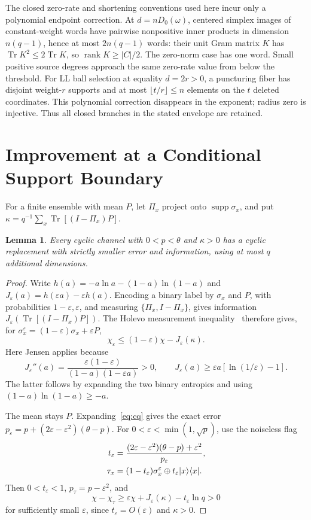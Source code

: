 \documentclass[12pt,letterpaper,onecolumn]{article}
\newtheorem{lemma}[theorem]{Lemma}
\theoremstyle{definition}
\theoremstyle{remark}
\DeclareMathOperator{\Tr}{Tr}
\DeclareMathOperator{\supp}{supp}
\DeclareMathOperator{\rank}{rank}
\begin{document}
The closed zero-rate and shortening conventions used here incur only a polynomial endpoint correction. At \(d=nD_0(\omega)\), centered simplex images of constant-weight words have pairwise nonpositive inner products in dimension \(n(q-1)\), hence at most \(2n(q-1)\) words: their unit Gram matrix \(K\) has \(\Tr K^2\le2\Tr K\), so \(\rank K\ge |C|/2\). The zero-norm case has one word. Small positive source degrees approach the same zero-rate value from below the threshold. For LL ball selection at equality \(d=2r>0\), a puncturing fiber has disjoint weight-\(r\) supports and at most \(\lfloor t/r\rfloor\le n\) elements on the \(t\) deleted coordinates. This polynomial correction disappears in the exponent; radius zero is injective. Thus all closed branches in the stated envelope are retained.

\section{Improvement at a Conditional Support Boundary}
For a finite ensemble with mean \(P\), let \(\Pi_x\) project onto \(\supp\sigma_x\), and put
\(\kappa=q^{-1}\sum_x\Tr[(I-\Pi_x)P]\).

\begin{lemma}\label{lem:activation}
Every cyclic channel with \(0<p<\theta\) and \(\kappa>0\) has a cyclic replacement with strictly smaller error and information, using at most \(q\) additional dimensions.
\end{lemma}
\begin{proof}
Write \(h(a)=-a\ln a-(1-a)\ln(1-a)\) and
\(J_\varepsilon(a)=h(\varepsilon a)-\varepsilon h(a)\).
Encoding a binary label by \(\sigma_x\) and \(P\), with probabilities \(1-\varepsilon,\varepsilon\), and measuring
\(\{\Pi_x,I-\Pi_x\}\), gives information \(J_\varepsilon(\Tr[(I-\Pi_x)P])\). The Holevo measurement inequality~\cite{Holevo1973} therefore gives, for
\(\sigma_x^\varepsilon=(1-\varepsilon)\sigma_x+\varepsilon P\),
\begin{equation}\label{eq:entropyactivation}
\chi_\varepsilon\le(1-\varepsilon)\chi-J_\varepsilon(\kappa).
\end{equation}
Here Jensen applies because
\[
J_\varepsilon''(a)=
\frac{\varepsilon(1-\varepsilon)}{(1-a)(1-\varepsilon a)}>0,\qquad
J_\varepsilon(a)\ge\varepsilon a[\ln(1/\varepsilon)-1].
\]
The latter follows by expanding the two binary entropies and using
\((1-a)\ln(1-a)\ge-a\).

The mean stays \(P\). Expanding~\eqref{eq:cq} gives the exact error
\(p_\varepsilon=p+(2\varepsilon-\varepsilon^2)(\theta-p)\).
For \(0<\varepsilon<\min(1,\sqrt p)\), use the noiseless flag
\begin{align}
t_\varepsilon&=\frac{(2\varepsilon-\varepsilon^2)(\theta-p)+\varepsilon^2}
{p_\varepsilon},\notag\\
\tau_x&=(1-t_\varepsilon)\sigma_x^\varepsilon
\oplus t_\varepsilon|x\rangle\langle x|.\label{eq:repair}
\end{align}
Then \(0<t_\varepsilon<1\), \(p_\tau=p-\varepsilon^2\), and
\[
\chi-\chi_\tau\ge\varepsilon\chi+
J_\varepsilon(\kappa)-t_\varepsilon\ln q>0
\]
for sufficiently small \(\varepsilon\), since \(t_\varepsilon=O(\varepsilon)\) and \(\kappa>0\).
\end{proof}
\end{document}

